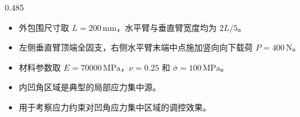 \documentclass[notheorems]{beamer}
\begin{document}
\begin{frame}
\begin{columns}[T, totalwidth=\linewidth]
\begin{column}{0.485\linewidth}
\begin{tcolorbox}
					{\fontsize{7.55}{10.6}\selectfont\sffamily
						\setlength{\leftmargini}{0.95em}
						\begin{itemize}
							\setlength{\itemsep}{4pt}
							\setlength{\topsep}{1pt}
							\setlength{\parsep}{0pt}
							\setlength{\parskip}{0pt}
							\item 外包围尺寸取 $L=200\,\mathrm{mm}$，水平臂与垂直臂宽度均为 $2L/5$。
							\item 左侧垂直臂顶端全固支，右侧水平臂末端中点施加竖向向下载荷 $P=400\,\mathrm{N}$。
							\item 材料参数取 $E=70000\,\mathrm{MPa}$，$\nu=0.25$ 和 $\bar{\sigma}=100\,\mathrm{MPa}$。
							\item 内凹角区域是典型的局部应力集中源。
							\item 用于考察应力约束对凹角应力集中区域的调控效果。
						\end{itemize}
						
					}
					
				\end{tcolorbox}
				
			\end{column}
			
		\end{columns}
		
	\end{frame}
	
	
\end{document}
